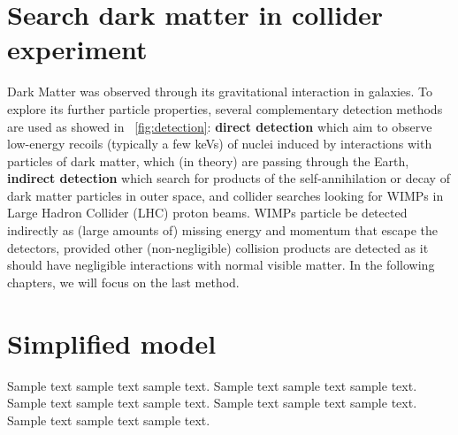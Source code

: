 \section{Search dark matter in collider experiment}
\par Dark Matter was observed through its gravitational interaction in galaxies. To explore  its further particle properties, several complementary detection methods are used as showed in ~\ref{fig:detection}\cite{Undagoitia:2015gya}: \textbf{direct detection} which aim to observe low-energy recoils (typically a few keVs) of nuclei induced by interactions with particles of dark matter, which (in theory) are passing through the Earth, \textbf{indirect detection} which search for products of the self-annihilation or decay of dark matter particles in outer space, and collider searches looking for WIMPs in Large Hadron Collider (LHC) proton beams. WIMPs particle be detected indirectly as (large amounts of) missing energy and momentum that escape the detectors, provided other (non-negligible) collision products are detected as it should have negligible interactions with normal visible matter. In the following chapters, we will focus on the last method.


\section{Simplified model}
Sample text sample text sample text. Sample text sample text sample text.
Sample text sample text sample text. Sample text sample text sample text.
Sample text sample text sample text. \cite{SimplifiedModels-Alves2012}

